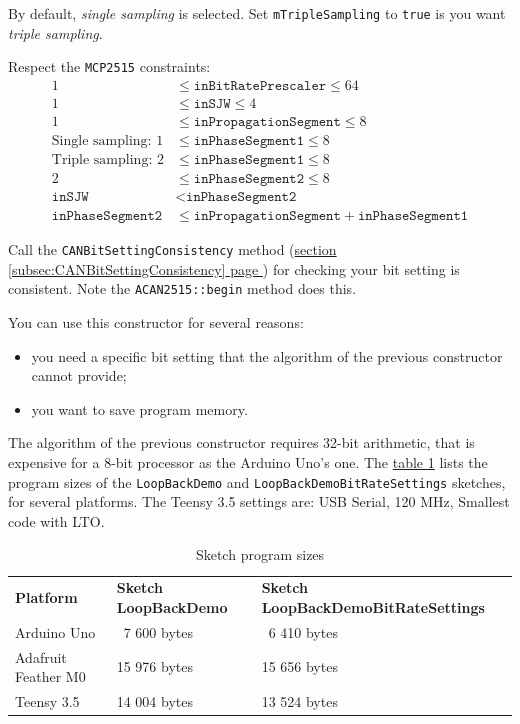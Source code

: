 \documentclass[10pt, a4paper, obeyspaces]{extarticle}
\newcommand\refSubsectionPage[1]{\hyperref[subsec:#1]{section \ref*{subsec:#1} page \pageref{subsec:#1}}}
\newcommand\labelTableau[1]{\label{tab:#1}}
\newcommand\refTableau[1]{\hyperref[tab:#1]{table \ref*{tab:#1}}}
\begin{document}
By default, \emph{single sampling} is selected. Set \texttt{mTripleSampling} to \texttt{true} is you want \emph{triple sampling}.

Respect the \texttt{MCP2515} constraints:
\begin{align*}
1 & \leqslant \texttt{inBitRatePrescaler} \leqslant 64 \\
1 & \leqslant \texttt{inSJW} \leqslant 4 \\
1 & \leqslant \texttt{inPropagationSegment} \leqslant 8 \\
\text{Single sampling: }1 & \leqslant \texttt{inPhaseSegment1} \leqslant 8\\
\text{Triple sampling: }2 & \leqslant \texttt{inPhaseSegment1} \leqslant 8\\
2 & \leqslant \texttt{inPhaseSegment2} \leqslant 8 \\
\texttt{inSJW} &<\texttt{inPhaseSegment2}\\
\texttt{inPhaseSegment2} & \leqslant \texttt{inPropagationSegment} + \texttt{inPhaseSegment1}
\end{align*}

Call the \texttt{CANBitSettingConsistency} method (\refSubsectionPage{CANBitSettingConsistency}) for checking your bit setting is consistent. Note the \texttt{ACAN2515::begin} method does this.

You can use this constructor for several reasons:
\begin{itemize}
  \item you need a specific bit setting that the algorithm of the previous constructor cannot provide;
  \item you want to save program memory.
\end{itemize}

The algorithm of the previous constructor requires 32-bit arithmetic, that is expensive for a 8-bit processor as the Arduino Uno's one. The \refTableau{sketchSizes} lists the program sizes of the \texttt{LoopBackDemo} and \texttt{LoopBackDemoBitRateSettings} sketches, for several platforms. The Teensy 3.5 settings are: USB Serial, 120 MHz, Smallest code with LTO.

\begin{table}[!ht]
  \small
  \onehalfspacing
  \centering
  \begin{tabular}{lll}
    \textbf{Platform} & \textbf{Sketch LoopBackDemo} & \textbf{Sketch LoopBackDemoBitRateSettings}\\
    Arduino Uno & ~7 600 bytes & ~6 410 bytes\\
    Adafruit Feather M0 & 15 976 bytes & 15 656 bytes\\
    Teensy 3.5 & 14 004 bytes & 13 524 bytes\\
  \end{tabular}
  \caption{Sketch program sizes}
  \labelTableau{sketchSizes}
\end{table}
\end{document}
